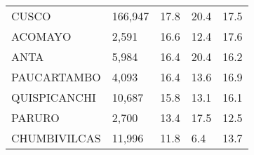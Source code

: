 \begin{tabular}{lllll}
	\cellcolor[HTML]{FF5050}CUSCO                                  & 166,947                                                               & 17.8                                                                             & 20.4                                                                        & 17.5                                                                                \\
	\cellcolor[HTML]{FF5050}ACOMAYO                                & 2,591                                                                 & 16.6                                                                             & 12.4                                                                        & 17.6                                                                                \\
	\cellcolor[HTML]{FF5050}ANTA                                   & 5,984                                                                 & 16.4                                                                             & 20.4                                                                        & 16.2                                                                                \\
	\cellcolor[HTML]{FF5050}PAUCARTAMBO                            & 4,093                                                                 & 16.4                                                                             & 13.6                                                                        & 16.9                                                                                \\
	\cellcolor[HTML]{FF5050}QUISPICANCHI                           & 10,687                                                                & 15.8                                                                             & 13.1                                                                        & 16.1                                                                                \\
	\cellcolor[HTML]{FF5050}PARURO                                 & 2,700                                                                 & 13.4                                                                             & 17.5                                                                        & 12.5                                                                                \\
	\cellcolor[HTML]{FF5050}CHUMBIVILCAS                           & 11,996                                                                & 11.8                                                                             & 6.4                                                                         & 13.7                                                                                \\

\end{tabular}
